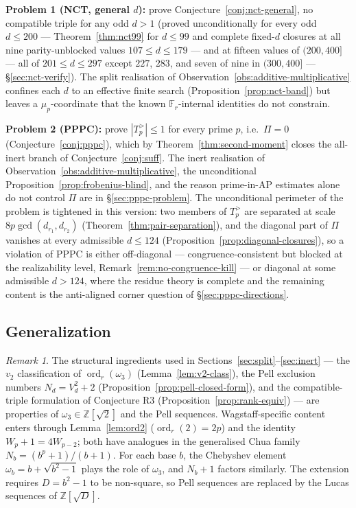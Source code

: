 \documentclass[11pt]{amsart}
\theoremstyle{plain}
\theoremstyle{definition}
\theoremstyle{remark}
\newtheorem*{remarknonum}{Remark}
\numberwithin{equation}{section}
\newcommand{\ord}{\operatorname{ord}}
\newcommand{\Z}{\mathbb{Z}}
\newcommand{\F}{\mathbb{F}}
\begin{document}
\textbf{Problem 1 (NCT, general $d$):} prove Conjecture~\ref{conj:nct-general}, no compatible triple for any odd $d > 1$ (proved unconditionally for every odd $d \leq 200$ --- Theorem~\ref{thm:nct99} for $d \leq 99$ and complete fixed-$d$ closures at all nine parity-unblocked values $107 \leq d \leq 179$ --- and at fifteen values of $(200,400]$ --- all of $201 \leq d \leq 297$ except $227$, $283$, and seven of nine in $(300,400]$ --- \S\ref{sec:nct-verify}). The split realisation of Observation~\ref{obs:additive-multiplicative} confines each $d$ to an effective finite search (Proposition~\ref{prop:nct-band}) but leaves a $\mu_p$-coordinate that the known $\F_r$-internal identities do not constrain.

\textbf{Problem 2 (PPPC):} prove $|T_p^{>}| \leq 1$ for every prime $p$, i.e.\ $\Pi = 0$ (Conjecture~\ref{conj:pppc}), which by Theorem~\ref{thm:second-moment} closes the all-inert branch of Conjecture~\ref{conj:suff}. The inert realisation of Observation~\ref{obs:additive-multiplicative}, the unconditional Proposition~\ref{prop:frobenius-blind}, and the reason prime-in-AP estimates alone do not control $\Pi$ are in \S\ref{sec:pppc-problem}. The unconditional perimeter of the problem is tightened in this version: two members of $T_p^{>}$ are separated at scale $8 p \gcd(d_{r_1}, d_{r_2})$ (Theorem~\ref{thm:pair-separation}), and the diagonal part of $\Pi$ vanishes at every admissible $d \leq 124$ (Proposition~\ref{prop:diagonal-closures}), so a violation of PPPC is either off-diagonal --- congruence-consistent but blocked at the realizability level, Remark~\ref{rem:no-congruence-kill} --- or diagonal at some admissible $d > 124$, where the residue theory is complete and the remaining content is the anti-aligned corner question of \S\ref{sec:pppc-directions}.

\subsection{Generalization}\label{sec:generalization}

\begin{remarknonum}
The structural ingredients used in Sections~\ref{sec:split}--\ref{sec:inert} --- the $v_2$ classification of $\ord_r(\omega_3)$ (Lemma~\ref{lem:v2-class}), the Pell exclusion numbers $N_d = V_d^2 + 2$ (Proposition~\ref{prop:pell-closed-form}), and the compatible-triple formulation of Conjecture R3 (Proposition~\ref{prop:rank-equiv}) --- are properties of $\omega_3 \in \Z[\sqrt 2]$ and the Pell sequences. Wagstaff-specific content enters through Lemma~\ref{lem:ord2} ($\ord_r(2) = 2 p$) and the identity $W_p + 1 = 4 W_{p-2}$; both have analogues in the generalised Chua family $N_b = (b^p + 1)/(b + 1)$. For each base $b$, the Chebyshev element $\omega_b = b + \sqrt{b^2 - 1}$ plays the role of $\omega_3$, and $N_b + 1$ factors similarly. The extension requires $D = b^2 - 1$ to be non-square, so Pell sequences are replaced by the Lucas sequences of $\Z[\sqrt D]$.
\end{remarknonum}
\end{document}
